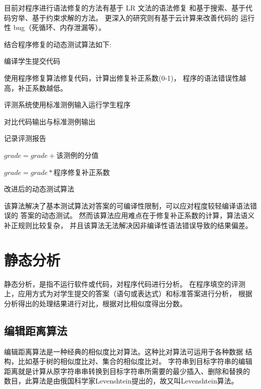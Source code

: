 % 

目前对程序进行语法修复的方法有基于 LR 文法的语法修复\cite{Barnard1982Hierarchic}
和基于搜索、基于代码穷举、基于约束求解的方法\cite{xuan2016}。
更深入的研究则有基于云计算来改善代码的
运行性 bug（死循环、内存泄漏等）\cite{Goues2012A}。

结合程序修复的动态测试算法如下:

\begin{algorithm}[h]
	编译学生提交代码

	 {
	  使用程序修复算法修复代码，计算出修复补正系数(0-1)，
		程序的语法错误性越高，补正系数越低。
	} 

	 {
    评测系统使用标准测例输入运行学生程序

		 {
	    对比代码输出与标准测例输出

			记录评测报告

			 {
			  $grade = grade + $该测例的分值
			}
	  }
	}

	$grade = grade * $程序修复补正系数
  \caption{改进后的动态测试算法}
  \label{algo:dynamic_test}
\end{algorithm}

该算法解决了基本测试算法对答案的可编译性限制，可以应对程度较轻编译语法错误的
答案的动态测试。
然而该算法应用难点在于修复补正系数的计算，算法语义补正规则比较复杂，
并且该算法无法解决因非编译性语法错误导致的结果偏差。

\section{静态分析}
静态分析，是指不运行软件或代码，对程序代码进行分析\cite{zhangjian2008}。
在程序填空的评测上，应用方式为对学生提交的答案（语句或表达式）和标准答案进行分析，
根据分析得出的处理结果进行对比，根据对比相似度得出分数。

\subsection{编辑距离算法}
编辑距离算法是一种经典的相似度比对算法。这种比对算法可运用于各种数据
结构，比如基于树的相似度比对\cite{Bille2005A}、集合的相似度比对\cite{linxuemin2011}。
字符串到目标字符串的编辑距离就是计算从原字符串串转换到目标字符串所需要的最少插入、删除和替换的
数目，此算法是由俄国科学家Levenshtein提出的，故又叫Levenshtein算法。

